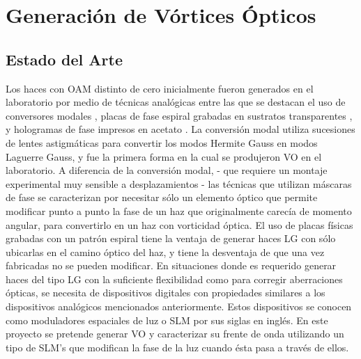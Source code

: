 

\chapter{Generación de Vórtices Ópticos}
\label{cha:Gen_intro}

\graphicspath{{Figures/ch2_img/}{../Figures/ch2_img/}}

\section{Estado del Arte} %
\label{sec:ChGen_estado_del_arte}
Los haces con OAM distinto de cero inicialmente fueron generados en el
laboratorio por medio de técnicas analógicas entre las que se destacan
el uso de conversores modales , placas de fase espiral grabadas en sustratos
transparentes , y hologramas de fase impresos en acetato
 . La conversión modal utiliza sucesiones de
lentes astigmáticas para convertir los modos Hermite Gauss en modos
Laguerre Gauss, y fue la primera forma en la cual se produjeron VO en
el laboratorio. A diferencia de la conversión modal, - que requiere un
montaje experimental muy sensible a desplazamientos -  las técnicas que utilizan máscaras
de fase se caracterizan por necesitar sólo un elemento óptico que
permite modificar punto a punto la fase de un haz que originalmente
carecía de momento angular, para convertirlo en un haz con vorticidad
óptica. El uso de placas físicas grabadas con un patrón espiral
tiene la ventaja de generar haces LG con sólo ubicarlas en
el camino óptico del haz, y tiene la desventaja de que una vez
fabricadas no se pueden modificar. 
En situaciones donde es requerido generar haces del tipo LG con la suficiente
flexibilidad como para corregir aberraciones ópticas, se
necesita de dispositivos digitales con propiedades similares a los
dispositivos analógicos mencionados anteriormente. Estos dispositivos
se conocen como moduladores espaciales de luz o SLM por sus siglas en
inglés. En este proyecto se pretende generar VO y caracterizar su
frente de onda utilizando un tipo de SLM's que modifican la fase de la
luz cuando ésta pasa a través de ellos. 

